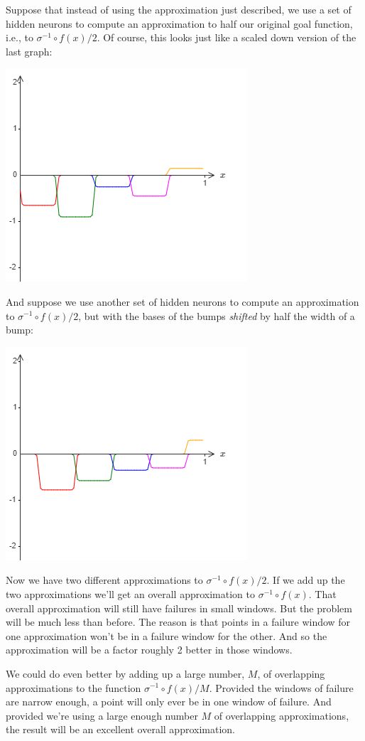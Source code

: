 \documentclass[a4paper,twoside,10pt]{book}
\begin{document}
Suppose that instead of using the approximation just described, we use a set of hidden neurons to compute an approximation to half our original goal function, i.e., to $\sigma^{-1}\circ f(x)/2$. Of course, this looks just like a scaled down version of the last graph:
\begin{center}
	\includegraphics[width=0.4\linewidth]{figures/ch4/tikz456}
\end{center}
And suppose we use another set of hidden neurons to compute an approximation to $\sigma^{-1}\circ f(x)/2$, but with the bases of the bumps \textit{shifted} by half the width of a bump:
\begin{center}
	\includegraphics[width=0.4\linewidth]{figures/ch4/tikz457}
\end{center}
Now we have two different approximations to $\sigma^{-1}\circ f(x)/2$. If we add up the two approximations we'll get an overall approximation to $\sigma^{-1}\circ f(x)$. That overall approximation will still have failures in small windows. But the problem will be much less than before. The reason is that points in a failure window for one approximation won't be in a failure window for the other. And so the approximation will be a factor roughly 2 better in those windows.

We could do even better by adding up a large number, $M$, of overlapping approximations to the function $\sigma^{-1}\circ f(x)/M$. Provided the windows of failure are narrow enough, a point will only ever be in one window of failure. And provided we're using a large enough number $M$ of overlapping approximations, the result will be an excellent overall approximation.
\end{document}
